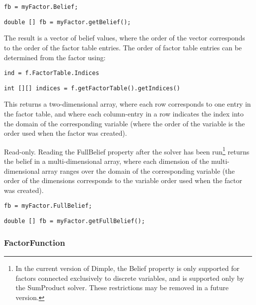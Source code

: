 \ifmatlab
\begin{lstlisting}
fb = myFactor.Belief;
\end{lstlisting}
\fi

\ifjava
\begin{lstlisting}
double [] fb = myFactor.getBelief();
\end{lstlisting}
\fi

The result is a vector of belief values, where the order of the vector corresponds to the order of the factor table entries.  The order of factor table entries can be determined from the factor using:

\ifmatlab
\begin{lstlisting}
ind = f.FactorTable.Indices
\end{lstlisting}
\fi

\ifjava
\begin{lstlisting}
int [][] indices = f.getFactorTable().getIndices()
\end{lstlisting}
\fi

This returns a two-dimensional array, where each row corresponds to one entry in the factor table, and where each column-entry in a row indicates the index into the domain of the corresponding variable (where the order of the variable is the order used when the factor was created).


\label{sec:Factor.FullBelief}

Read-only.  Reading the FullBelief property after the solver has been run\footnote{In the current version of Dimple, the Belief property is only supported for factors connected exclusively to discrete variables, and is supported only by the SumProduct solver.  These restrictions may be removed in a future version.} returns the belief in a multi-dimensional array, where each dimension of the multi-dimensional array ranges over the domain of the corresponding variable (the order of the dimensions corresponds to the variable order used when the factor was created).

\ifmatlab
\begin{lstlisting}
fb = myFactor.FullBelief;
\end{lstlisting}
\fi

\ifjava
\begin{lstlisting}
double [] fb = myFactor.getFullBelief();
\end{lstlisting}
\fi

\subsubsection{FactorFunction}
\label{sec:FactorFunction}

